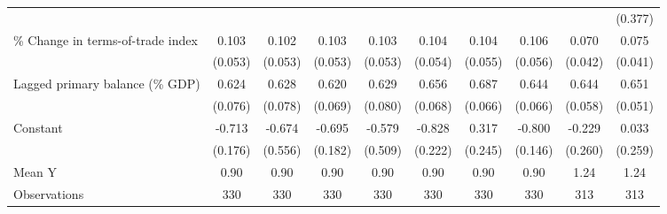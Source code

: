 {\begin{tabular}{l*{9}{c}}
                    &                     &                     &                     &                     &                     &                     &                     &                     &     (0.377)         \\
\addlinespace
\% Change in terms-of-trade index&       0.103\sym{*}  &       0.102\sym{*}  &       0.103\sym{*}  &       0.103\sym{*}  &       0.104\sym{*}  &       0.104\sym{*}  &       0.106\sym{*}  &       0.070         &       0.075\sym{*}  \\
                    &     (0.053)         &     (0.053)         &     (0.053)         &     (0.053)         &     (0.054)         &     (0.055)         &     (0.056)         &     (0.042)         &     (0.041)         \\
\addlinespace
Lagged primary balance (\% GDP)&       0.624\sym{***}&       0.628\sym{***}&       0.620\sym{***}&       0.629\sym{***}&       0.656\sym{***}&       0.687\sym{***}&       0.644\sym{***}&       0.644\sym{***}&       0.651\sym{***}\\
                    &     (0.076)         &     (0.078)         &     (0.069)         &     (0.080)         &     (0.068)         &     (0.066)         &     (0.066)         &     (0.058)         &     (0.051)         \\
\addlinespace
Constant            &      -0.713\sym{***}&      -0.674         &      -0.695\sym{***}&      -0.579         &      -0.828\sym{***}&       0.317         &      -0.800\sym{***}&      -0.229         &       0.033         \\
                    &     (0.176)         &     (0.556)         &     (0.182)         &     (0.509)         &     (0.222)         &     (0.245)         &     (0.146)         &     (0.260)         &     (0.259)         \\
\midrule
Mean Y              &        0.90         &        0.90         &        0.90         &        0.90         &        0.90         &        0.90         &        0.90         &        1.24         &        1.24         \\
Observations        &         330         &         330         &         330         &         330         &         330         &         330         &         330         &         313         &         313         \\
\bottomrule
\end{tabular}
}
